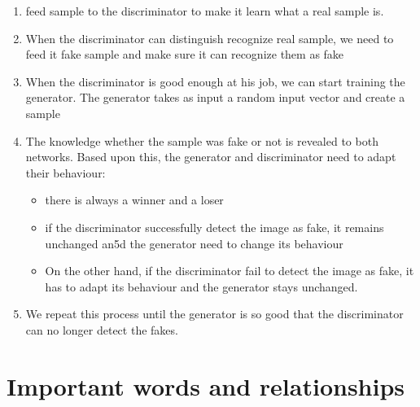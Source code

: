 \documentclass{article}
\begin{document}
\begin{enumerate}
    \item feed sample to the discriminator to make it learn what a real sample is.
    \item When the discriminator can distinguish recognize real sample, we need to feed it fake sample and make sure it can recognize them as fake
    \item When the discriminator is good enough at his job, we can start training the generator. The generator takes as input a random input vector and create a sample
    \item The knowledge whether the sample was fake or not is revealed to both networks. Based upon this, the generator and discriminator need to adapt their behaviour:
    \begin{itemize}
        \item there is always a winner and a loser
        \item if the discriminator successfully detect the image as fake, it remains unchanged an5d the generator need to change its behaviour 
        \item On the other hand, if the discriminator fail to detect the image as fake, it has to adapt its behaviour and the generator stays unchanged. 
    \end{itemize}
    \item We repeat this process until the generator is so good that the discriminator can no longer detect the fakes.
\end{enumerate}

\section{Important words and relationships}
\end{document}
